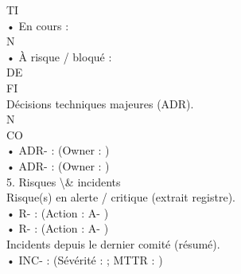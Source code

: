 \documentclass[12pt,landscape,a4paper]{article}
\begin{document}
\vspace{0.5em}
TI\\
• En cours :\\
\vspace{0.5em}
\vspace{0.5em}
\vspace{0.5em}
\vspace{0.5em}
N\\
• À risque / bloqué :\\
\vspace{0.5em}
\vspace{0.5em}
\vspace{0.5em}
\vspace{0.5em}
DE\\
FI\\
Décisions techniques majeures (ADR).\\
\vspace{0.5em}
\vspace{0.5em}
\vspace{0.5em}
N\\
CO\\
• ADR-             :                                                           (Owner :                           )\\
\vspace{0.5em}
• ADR-             :                                                           (Owner :                           )\\
\vspace{0.5em}
\vspace{0.5em}
\vspace{0.5em}
5. Risques \textbackslash{}& incidents\\
Risque(s) en alerte / critique (extrait registre).\\
• R-           :                                                              (Action : A-       )\\
\vspace{0.5em}
• R-           :                                                              (Action : A-       )\\
\vspace{0.5em}
\vspace{0.5em}
\vspace{0.5em}
Incidents depuis le dernier comité (résumé).\\
• INC-                 :                                                          (Sévérité :         ; MTTR :          )\\
\vspace{0.5em}
\end{document}
